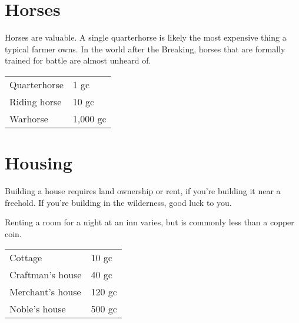 \section{Horses}

Horses are valuable. A single quarterhorse is likely the most
expensive thing a typical farmer owns. In the world after the
Breaking, horses that are formally trained for battle are
almost unheard of.

\begin{center}
{
\begin{xtabular}{|l|l|}
Quarterhorse & 1 gc \\
Riding horse & 10 gc \\
Warhorse & 1,000 gc \\
\hline
\end{xtabular}
}
\end{center}

\section{Housing}

Building a house requires land ownership or rent, if you're
building it near a freehold. If you're building in the wilderness,
good luck to you.

Renting a room for a night at an inn varies, but is commonly
less than a copper coin.

\begin{center}
{
\begin{xtabular}{|l|l|}
Cottage & 10 gc \\
Craftman's house & 40 gc \\
Merchant's house & 120 gc \\
Noble's house & 500 gc \\
\hline
\end{xtabular}
}
\end{center}
